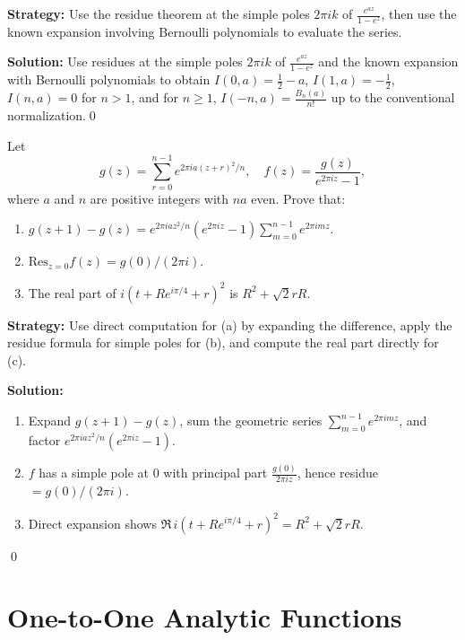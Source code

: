 \noindent\textbf{Strategy:} Use the residue theorem at the simple poles \( 2\pi i k \) of \( \frac{e^{az}}{1-e^z} \), then use the known expansion involving Bernoulli polynomials to evaluate the series.

\bigskip\noindent\textbf{Solution:}
Use residues at the simple poles $2\pi i k$ of $\frac{e^{az}}{1-e^z}$ and the known expansion with Bernoulli polynomials to obtain $I(0,a)=\tfrac12-a$, $I(1,a)=-\tfrac12$, $I(n,a)=0$ for $n>1$, and for $n\ge1$, $I(-n,a)=\tfrac{B_n(a)}{n!}$ up to the conventional normalization.\qed


\begin{problembox}
\begin{problemstatement}
Let
\[ g(z) = \sum_{r=0}^{n-1} e^{2\pi i a (z + r)^2 / n}, \quad f(z) = \frac{g(z)}{e^{2\pi i z} - 1}, \]
where \( a \) and \( n \) are positive integers with \( na \) even. Prove that:
\begin{enumerate}[label=(\alph*)]
\item \( g(z + 1) - g(z) = e^{2\pi i a z^2 / n} (e^{2\pi i z} - 1) \sum_{m=0}^{n-1} e^{2\pi i m z}. \)
\item \( \text{Res}_{z=0} f(z) = g(0) / (2\pi i). \)
\item The real part of \( i (t + R e^{i\pi / 4} + r)^2 \) is \( R^2 + \sqrt{2} r R \).
\end{enumerate}
\end{problemstatement}
\end{problembox}

\noindent\textbf{Strategy:} Use direct computation for (a) by expanding the difference, apply the residue formula for simple poles for (b), and compute the real part directly for (c).

\bigskip\noindent\textbf{Solution:}
\begin{enumerate}[label=(\alph*)]
\item Expand $g(z+1)-g(z)$, sum the geometric series $\sum_{m=0}^{n-1}e^{2\pi i m z}$, and factor $e^{2\pi i a z^2/n}(e^{2\pi i z}-1)$.
\item $f$ has a simple pole at $0$ with principal part $\frac{g(0)}{2\pi i z}$, hence residue $=g(0)/(2\pi i)$.
\item Direct expansion shows $\Re\,i(t+Re^{i\pi/4}+r)^2=R^2+\sqrt2 rR$.
\end{enumerate}\qed
\section{One-to-One Analytic Functions}

